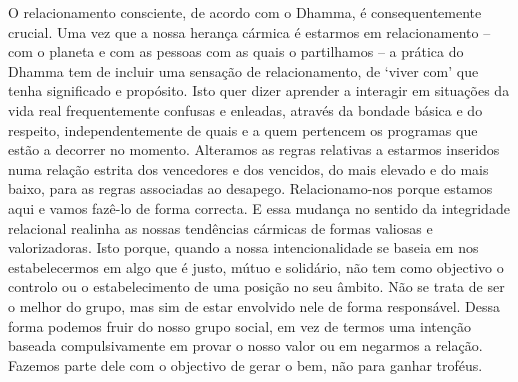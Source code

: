 O relacionamento consciente, de acordo com o Dhamma, é consequentemente crucial. Uma vez que a nossa herança cármica é estarmos em relacionamento -- com o planeta e com as pessoas com as quais o partilhamos -- a prática do Dhamma tem de incluir uma sensação de relacionamento, de `viver com' que tenha significado e propósito. Isto quer dizer aprender a interagir em situações da vida real frequentemente confusas e enleadas, através da bondade básica e do respeito, independentemente de quais e a quem pertencem os programas que estão a decorrer no momento. Alteramos as regras relativas a estarmos inseridos numa relação estrita dos vencedores e dos vencidos, do mais elevado e do mais baixo, para as regras associadas ao desapego. Relacionamo-nos porque estamos aqui e vamos fazê-lo de forma correcta. E essa mudança no sentido da integridade relacional realinha as nossas tendências cármicas de formas valiosas e valorizadoras. Isto porque, quando a nossa intencionalidade se baseia em nos estabelecermos em algo que é justo, mútuo e solidário, não tem como objectivo o controlo ou o estabelecimento de uma posição no seu âmbito. Não se trata de ser o melhor do grupo, mas sim de estar envolvido nele de forma responsável. Dessa forma podemos fruir do nosso grupo social, em vez de termos uma intenção baseada compulsivamente em provar o nosso valor ou em negarmos a relação. Fazemos parte dele com o objectivo de gerar o bem, não para ganhar troféus.

